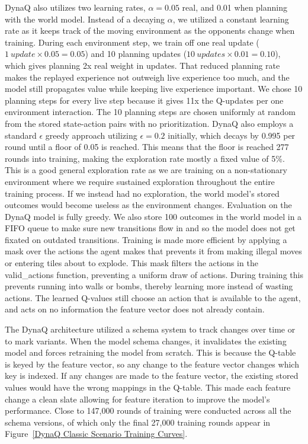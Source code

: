\documentclass[article, 10pt]{IEEEtran}
\begin{document}
DynaQ also utilizes two learning rates, $\alpha = 0.05$ real, and 0.01 when planning with the world model. Instead of a decaying $\alpha$, we utilized a constant learning rate as it keeps track of the moving environment as the opponents change when training. During each environment step, we train off one real update ($1\ update \times 0.05 = 0.05$) and 10 planning updates ($10\ updates \times 0.01 = 0.10$), which gives planning 2x real weight in updates. That reduced planning rate makes the replayed experience not outweigh live experience too much, and the model still propagates value while keeping live experience important. We chose 10 planning steps for every live step because it gives 11x the Q-updates per one environment interaction. The 10 planning steps are chosen uniformly at random from the stored state-action pairs with no prioritization. DynaQ also employs a standard $\epsilon$ greedy approach utilizing $\epsilon = 0.2$ initially, which decays by 0.995 per round until a floor of 0.05 is reached. This means that the floor is reached 277 rounds into training, making the exploration rate mostly a fixed value of 5\%. This is a good general exploration rate as we are training on a non-stationary environment where we require sustained exploration throughout the entire training process. If we instead had no exploration, the world model's stored outcomes would become useless as the environment changes. Evaluation on the DynaQ model is fully greedy. We also store 100 outcomes in the world model in a FIFO queue to make sure new transitions flow in and so the model does not get fixated on outdated transitions. Training is made more efficient by applying a mask over the actions the agent makes that prevents it from making illegal moves or entering tiles about to explode. This mask filters the actions in the valid\_actions function, preventing a uniform draw of actions. During training this prevents running into walls or bombs, thereby learning more instead of wasting actions. The learned Q-values still choose an action that is available to the agent, and acts on no information the feature vector does not already contain.

The DynaQ architecture utilized a schema system to track changes over time or to mark variants. When the model schema changes, it invalidates the existing model and forces retraining the model from scratch. This is because the Q-table is keyed by the feature vector, so any change to the feature vector changes which key is indexed. If any changes are made to the feature vector, the existing stored values would have the wrong mappings in the Q-table. This made each feature change a clean slate allowing for feature iteration to improve the model's performance. Close to 147,000 rounds of training were conducted across all the schema versions, of which only the final 27,000 training rounds appear in Figure~\ref{DynaQ Classic Scenario Training Curves}.
\end{document}
